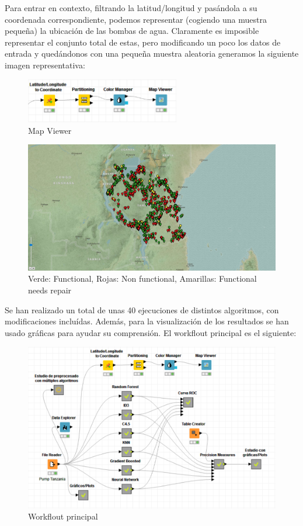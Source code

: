 	Para entrar en contexto, filtrando la latitud/longitud y pasándola a su coordenada correspondiente, podemos representar (cogiendo una muestra pequeña) la ubicación de las bombas de agua. Claramente es imposible representar el conjunto total de estas, pero modificando un poco los datos de entrada y quedándonos con una pequeña muestra aleatoria generamos la siguiente imagen representativa:
	
	
	\begin{figure}[H]
		\centering
		\includegraphics[width=0.6\textwidth]{img/mapa.png}
		\caption{Map Viewer}
	\end{figure}
	
	\begin{figure}[H]
		\centering
		\includegraphics[width=1\textwidth]{img/pump.png}
		\caption{Verde: Functional, Rojas: Non functional, Amarillas: Functional needs repair}
	\end{figure}
	


	\newpage
	

	Se han realizado un total de unas 40 ejecuciones de distintos algoritmos, con modificaciones incluídas. Además, para la visualización de los resultados se han usado gráficas para ayudar su comprensión. El workflout principal es el siguiente:
	
	\begin{figure}[H]
		\centering
		\includegraphics[width=1\textwidth]{img/primer.png}
		\caption{Workflout principal}
	\end{figure}

